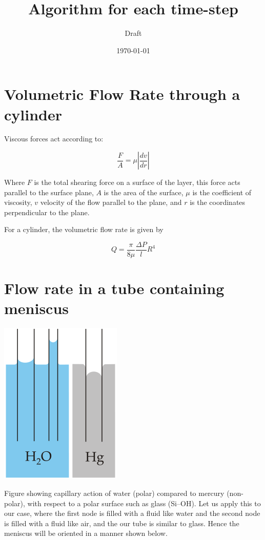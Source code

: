 \documentclass[12pt, a4paper]{article}
\title{Algorithm for each time-step}
\author{Draft}
\date{\today}
\begin{document}
\maketitle

\section{Volumetric Flow Rate through a cylinder}

Viscous forces act according to:

\[ \frac{F}{A} = \mu \left| \frac{dv}{dr} \right| \]

Where $F$ is the total shearing force on a surface of the layer, this force acts parallel to the surface plane, $A$ is the area of the surface, $\mu$ is the coefficient of viscosity, $v$ velocity of the flow parallel to the plane, and $r$ is the coordinates perpendicular to the plane.

For a cylinder, the volumetric flow rate is given by

\begin{equation} \label{eq:flow-rate}
\boxed{Q = \frac{\pi}{8\mu}\frac{\Delta P}{l} R^4}
\end{equation}


\section{Flow rate in a tube containing meniscus}

\includegraphics{fig_capact-of-water} \label{fig_capact-of-water}

Figure showing capillary action of water (polar) compared to mercury (non-polar), with respect to a polar surface such as glass (Si–OH). Let us apply this to our case, where the first node is filled with a fluid like water and the second node is filled with a fluid like air, and the our tube is similar to glass. Hence the meniscus will be oriented in a manner shown below.
\end{document}
